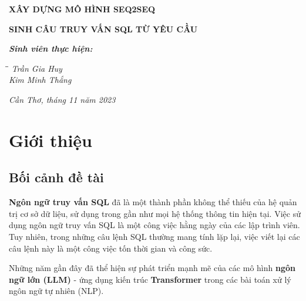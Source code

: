 \documentclass[a4paper, 10pt]{article}
\begin{document}
\begin{titlepage}
    \begin{center}
        \fontsize{16pt}{17pt}
        \textbf{XÂY DỰNG MÔ HÌNH SEQ2SEQ}

        \textbf{SINH CÂU TRUY VẤN SQL TỪ YÊU CẦU}
    \end{center}

    \vspace{1cm}

    \fontsize{14pt}{17pt}
    \textit{\textbf{Sinh viên thực hiện:}}

    \begin{tabbing}
        \hspace{6cm}\=\hspace{3cm}\=\kill
        {\it Trần Gia Huy}\>\\
        {\it Kim Minh Thắng}\>\\

    \end{tabbing}

    \vspace{2cm}

    \begin{center}
        {\it Cần Thơ, tháng 11 năm 2023}
    \end{center}
\end{titlepage}
\tableofcontents
\newpage

\listoffigures
\newpage

\maketitle %

\section{Giới thiệu}
\subsection{Bối cảnh đề tài}

\textbf{Ngôn ngữ truy vấn SQL} đã là một thành phần không thể thiếu của hệ quản trị cơ sở dữ liệu,
sử dụng trong gần như mọi hệ thống thông tin hiện tại. Việc sử dụng ngôn ngữ truy vấn SQL là một công việc hằng ngày của các lập trình viên.
Tuy nhiên, trong những câu lệnh SQL thường mang tính lặp lại, việc viết lại các câu lệnh này là một công việc tốn thời gian và công sức.

Những năm gần đây đã thể hiện sự phát triển mạnh mẽ của các mô hình \textbf{ngôn ngữ lớn (LLM)} - ứng dụng kiến trúc \textbf{Transformer} 
trong các bài toán xử lý ngôn ngữ tự nhiên (NLP).
\end{document}
